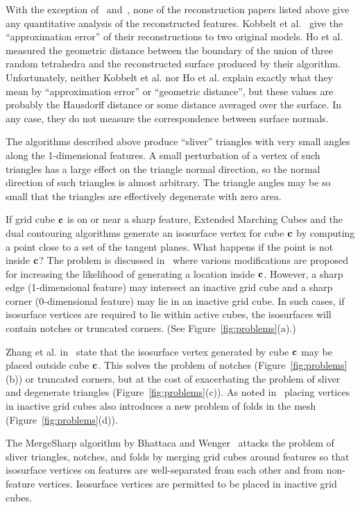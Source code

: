 With the exception of~\cite{kbsh-fssev-01} and~\cite{hwco-cmsaf-05},
none of the reconstruction papers listed above give any quantitative
analysis of the reconstructed features.
Kobbelt et al.~\cite{kbsh-fssev-01} give the ``approximation error''
of their reconstructions to two original models.
Ho et al.~\cite{hwco-cmsaf-05} measured the geometric distance
between the boundary of the union of three random tetrahedra and 
the reconstructed surface produced by their algorithm.
Unfortunately, neither Kobbelt et al. nor Ho et al. explain
exactly what they mean by ``approximation error'' or ``geometric distance'',
but these values are probably the Hausdorff distance 
or some distance averaged over the surface.
In any case, they do not measure the correspondence 
between surface normals.

The algorithms described above 
produce ``sliver'' triangles with very small angles 
along the 1-dimensional features.
A small perturbation of a vertex of such triangles
has a large effect on the triangle normal direction,
so the normal direction of such triangles is almost arbitrary.
The triangle angles may be so small that the triangles are effectively
degenerate with zero area.

If grid cube $\mathbf{c}$ is on or near a sharp feature,
Extended Marching Cubes and the dual contouring algorithms
generate an isosurface vertex for cube $\mathbf{c}$
by computing a point close to a set of the tangent planes.
What happens if the point is not inside $\mathbf{c}$?
The problem is discussed in~\cite{sw-dcss-02}
where various modifications are proposed for increasing the likelihood
of generating a location inside $\mathbf{c}$.
However, a sharp edge (1-dimensional feature) may intersect 
an inactive grid cube  and a sharp corner (0-dimensional feature) 
may lie in an inactive grid cube.
In such cases, if isosurface vertices are required to lie within active cubes,
the isosurfaces will contain notches or truncated corners.
(See Figure~\ref{fig:problems}(a).)

Zhang et al. in~\cite{zhk-dctps-04} state that the isosurface vertex
generated by cube $\mathbf{c}$ may be placed outside cube $\mathbf{c}$.
This solves the problem of notches (Figure~\ref{fig:problems}(b))
or truncated corners,
but at the cost of exacerbating the problem 
of sliver and degenerate triangles (Figure~\ref{fig:problems}(c)).
As noted in~\cite{sw-dcss-02}
placing vertices in inactive grid cubes also introduces a new problem
of folds in the mesh (Figure~\ref{fig:problems}(d)).

The MergeSharp algorithm by Bhattaca and Wenger~\cite{bw-cisec-13,bw-erm-13}
attacks the problem of sliver triangles, notches, and folds
by merging grid cubes around features
so that isosurface vertices on features are well-separated 
from each other and from non-feature vertices.
Isosurface vertices are permitted to be placed in inactive grid cubes.

